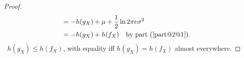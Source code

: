 \documentclass[
  coursecode={MTHE 474},
  assignmentname={Homework \homeworknumber},
  studentnumber=20053722,
  name={Bryan Hoang},
  draft,
]{
  ltxanswer%
}
\begin{document}
\begin{questions}
\begin{parts}
\begin{solution}
\begin{proof}
\begin{align*}
              &= -h(g_{X}) + \mu + \frac{1}{2} \ln 2\pi e\sigma^{2}                                                                                                                                           \\
              &= -h(g_{X}) + h(f_{X})\quad\text{by part~(\ref{part@2@1})}.
          \end{align*}
          \therefore\ \(h(g_{X}) \le h(f_{X})\), with equality iff \(h(g_{X}) = h(f_{X})\) almost everywhere.
        \end{proof}
      \end{solution}
    \end{parts}
  \end{questions}
\end{document}
